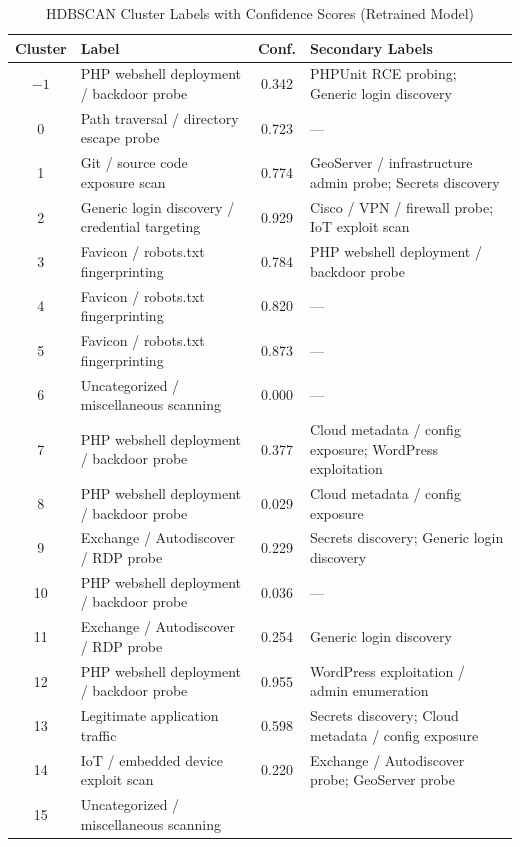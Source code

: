 \documentclass[12pt, a4paper]{report}   %
\begin{document}
\begin{table}[H]
\centering
\caption{HDBSCAN Cluster Labels with Confidence Scores (Retrained Model)}
\label{tab:clusters}
\small
\begin{tabularx}{\textwidth}{cXcX}
\toprule
\textbf{Cluster} & \textbf{Label} & \textbf{Conf.} 
& \textbf{Secondary Labels} \\
\midrule
$-1$ & PHP webshell deployment / backdoor probe      
& 0.342 & PHPUnit RCE probing; Generic login discovery \\
0  & Path traversal / directory escape probe       
& 0.723 & --- \\
1  & Git / source code exposure scan               
& 0.774 & GeoServer / infrastructure admin probe; Secrets discovery \\
2  & Generic login discovery / credential targeting 
& 0.929 & Cisco / VPN / firewall probe; IoT exploit scan \\
3  & Favicon / robots.txt fingerprinting           
& 0.784 & PHP webshell deployment / backdoor probe \\
4  & Favicon / robots.txt fingerprinting           
& 0.820 & --- \\
5  & Favicon / robots.txt fingerprinting           
& 0.873 & --- \\
6  & Uncategorized / miscellaneous scanning        
& 0.000 & --- \\
7  & PHP webshell deployment / backdoor probe      
& 0.377 & Cloud metadata / config exposure; WordPress exploitation \\
8  & PHP webshell deployment / backdoor probe      
& 0.029 & Cloud metadata / config exposure \\
9  & Exchange / Autodiscover / RDP probe           
& 0.229 & Secrets discovery; Generic login discovery \\
10  & PHP webshell deployment / backdoor probe      
& 0.036 & --- \\
11  & Exchange / Autodiscover / RDP probe           
& 0.254 & Generic login discovery \\
12  & PHP webshell deployment / backdoor probe      
& 0.955 & WordPress exploitation / admin enumeration \\
13  & Legitimate application traffic                
& 0.598 & Secrets discovery; Cloud metadata / config exposure \\
14  & IoT / embedded device exploit scan            
& 0.220 & Exchange / Autodiscover probe; GeoServer probe \\
15  & Uncategorized / miscellaneous scanning        

\end{tabularx}
\end{table}
\end{document}
